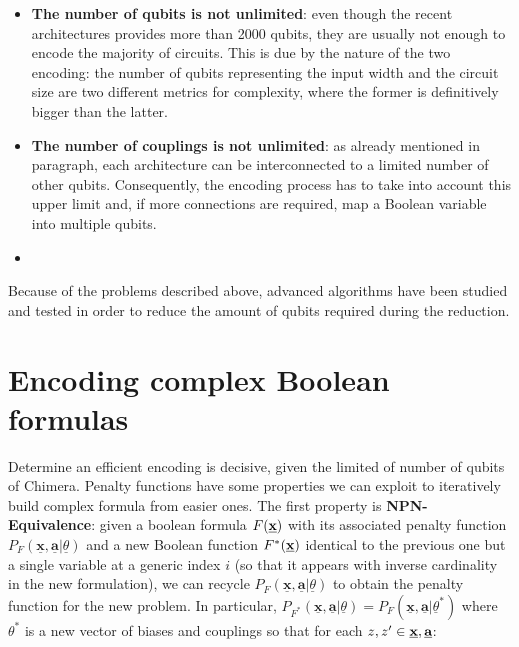 \begin{itemize}
    \item \textbf{The number of qubits is not unlimited}: even though the recent architectures provides more than 2000 qubits, they are usually not enough to encode the majority of circuits.
    This is due by the nature of the two encoding: the number of qubits representing the input width and the circuit size are two different metrics for complexity, where the former is definitively bigger than the latter. 
    \item \textbf{The number of couplings is not unlimited}: as already mentioned in paragraph, each architecture can be interconnected to a limited number of other qubits. Consequently, the encoding process has to take into account this upper limit and, if more connections are required, map a Boolean variable into multiple qubits.
    \item 
\end{itemize}

Because of the problems described above, advanced algorithms have been studied and tested in order to reduce the amount of qubits required during the reduction.

\section{Encoding complex Boolean formulas}

Determine an efficient encoding is decisive, given the limited of number of qubits of Chimera. Penalty functions have some properties we can exploit to iteratively build complex formula from easier ones. The first property is \textbf{NPN-Equivalence}: given a boolean formula $F(\textbf{\underline{x}})$ with its associated penalty function $P_F(\underline{\textbf{x}},\underline{\textbf{a}} | \underline{\theta})$ and a new Boolean function $F^*(\textbf{\underline{x}})$ identical to the previous one but a single variable at a generic index $i$ (so that it appears with inverse cardinality in the new formulation), we can recycle $P_F(\underline{\textbf{x}},\underline{\textbf{a}} | \underline{\theta})$ to obtain the penalty function for the new problem. In particular, $P_{F^*}(\underline{\textbf{x}},\underline{\textbf{a}} | \underline{\theta}) = P_F(\underline{\textbf{x}},\underline{\textbf{a}} | \underline{\theta}^*)$ where $\theta^*$ is a new vector of biases and couplings so that for each $z,z'\in \textbf{\underline{x}},\textbf{\underline{a}}$: \\ \\ \\


